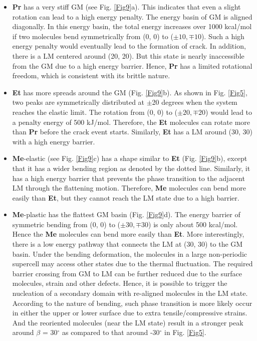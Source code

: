 \documentclass[prb,superscriptaddress,longbibliography, twocolumn]{revtex4-1}
\begin{document}
\begin{itemize}
    \item \textbf{Pr} has a very stiff GM (see Fig. \ref{Fig9}a). This indicates that even a slight rotation can lead to a high energy penalty. The energy basin of GM is aligned diagonally. In this energy basin, the total energy increases over 1000 kcal/mol if two molecules bend symmetrically from (0, 0) to ($\pm10, \mp10$). Such a high energy penalty would eventually lead to the formation of crack. In addition, there is a LM centered around (20, 20). But this state is nearly inaccessible from the GM due to a high energy barrier. Hence, \textbf{Pr} has a limited rotational freedom, which is consistent with its brittle nature.
    
    \item \textbf{Et} has more spreads around the GM (Fig. \ref{Fig9}b). As shown in Fig. \ref{Fig5}, two peaks are symmetrically distributed at $\pm$20 degrees when the system reaches the elastic limit. The rotation from (0, 0) to ($\pm20, \mp20$) would lead to a penalty energy of 500 kJ/mol. Therefore, the \textbf{Et} molecules can rotate more than \textbf{Pr} before the crack event starts. Similarly, \textbf{Et} has a LM around (30, 30) with a high energy barrier. 

    \item \textbf{Me}-elastic (see Fig. \ref{Fig9}c) has a shape similar to \textbf{Et} (Fig. \ref{Fig9}b), except that it has a wider bending region as denoted by the dotted line. Similarly, it has a high energy barrier that prevents the phase transition to the adjacent LM through the flattening motion. Therefore, \textbf{Me} molecules can bend more easily than \textbf{Et}, but they cannot reach the LM state due to a high barrier.

    \item \textbf{Me}-plastic has the flattest GM basin (Fig. \ref{Fig9}d). The energy barrier of symmetric bending from (0, 0) to ($\pm30, \mp30$) is only about 500 kcal/mol. Hence the \textbf{Me} molecules can bend more easily than \textbf{Et}. More interestingly, there is a low energy pathway that connects the LM at (30, 30) to the GM basin. Under the bending deformation, the molecules in a large non-periodic supercell may access other states due to the thermal fluctuation. The required barrier crossing from GM to LM can be further reduced due to the surface molecules, strain and other defects. Hence, it is possible to trigger the nucleation of a secondary domain with re-aligned molecules in the LM state. According to the nature of bending, such phase transition is more likely occur in either the upper or lower surface due to extra tensile/compressive strains. And the reoriented molecules (near the LM state) result in a stronger peak around $\beta$ = 30$^\circ$ as compared to that around -30$^\circ$ in Fig. \ref{Fig5}.   
\end{itemize}
\end{document}
